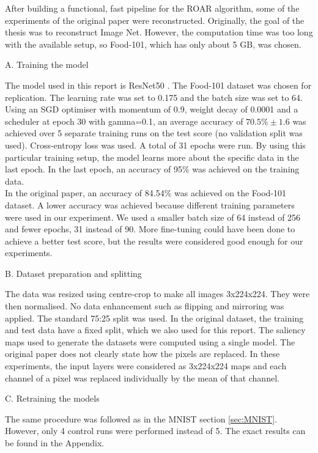 After building a functional, fast pipeline for the ROAR algorithm, some of the experiments of the original paper were reconstructed. Originally, the goal of the thesis was to reconstruct Image Net. However, the computation time was too long with the available setup, so Food-101, which has only about 5 GB, was chosen.

A. Training the model

The model used in this report is ResNet50 \cite{he2015deep}. The Food-101 \cite{bossard14} dataset was chosen for replication. The learning rate was set to 0.175 and the batch size was set to 64. Using an SGD optimiser with momentum of 0.9, weight decay of 0.0001 and a scheduler at epoch 30 with gamma=0.1, an average accuracy of $70.5\% \pm 1.6$ was achieved over 5 separate training runs on the test score (no validation split was used). Cross-entropy loss was used. A total of 31 epochs were run. By using this particular training setup, the model learns more about the specific data in the last epoch. In the last epoch, an accuracy of 95\% was achieved on the training data.\\
In the original paper, an accuracy of 84.54\% was achieved on the Food-101 dataset. A lower accuracy was achieved because different training parameters were used in our experiment. We used a smaller batch size of 64 instead of 256 and fewer epochs, 31 instead of 90. More fine-tuning could have been done to achieve a better test score, but the results were considered good enough for our experiments.

B. Dataset preparation and splitting

The data was resized using centre-crop to make all images 3x224x224. They were then normalised. No data enhancement such as flipping and mirroring was applied. The standard 75:25 split was used. In the original dataset, the training and test data have a fixed split, which we also used for this report. The saliency maps used to generate the datasets were computed using a single model. The original paper does not clearly state how the pixels are replaced. In these experiments, the input layers were considered as 3x224x224 maps and each channel of a pixel was replaced individually by the mean of that channel.

C. Retraining the models

The same procedure was followed as in the MNIST section \ref{sec:MNIST}. However, only 4 control runs were performed instead of 5. The exact results can be found in the Appendix.

